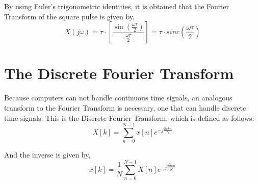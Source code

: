 By using Euler's trigonometric identities, it is obtained that the Fourier Transform of the square pulse is given by,
\begin{equation}
    X(j\omega) = \tau \cdot \left[\frac{\sin(\frac{\omega \tau}{2})}{\frac{\omega \tau}{2}}\right] = \tau \cdot sinc\left(\frac{\omega \tau}{2}\right)
\end{equation}

\section{The Discrete Fourier Transform}
Because computers can not handle continuous time signals, an analogous transform to the Fourier Transform is necessary, one that can handle discrete time signals. This is the Discrete Fourier Transform, which is defined as follows:
\begin{equation}
    X[k] = \sum_{n=0}^{N-1}x[n]e^{-j\frac{2\pi kn}{N}}
\end{equation}

And the inverse is given by,
\begin{equation}
    x[k] = \frac{1}{N}\sum_{n=0}^{N-1}X[n]e^{-j\frac{2 \pi kn}{N}}
\end{equation}